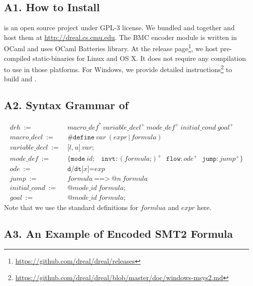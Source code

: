 \subsection*{A1. How to Install}
\dReach{} is an open source project under GPL-3 license. We bundled
\dReal{} and \dReach{} together and host them at
\url{http://dreal.cs.cmu.edu}. The BMC encoder module is written in
OCaml and uses OCaml Batteries library. At the release
page\footnote{\url{https://github.com/dreal/dreal/releases}}, we host
pre-compiled static-binaries for Linux and OS X. It does not require
any compilation to use \dReach{} in those platforms. For Windows, we
provide detailed
instructions\footnote{\url{https://github.com/dreal/dreal/blob/master/doc/windows-msys2.md}}
to build \dReach{} and \dReal{}.

\subsection*{A2. Syntax Grammar of \drh{}}
\begin{align*}
  \mathit{drh} \ := \ & \mathit{macro\_def}^* \
  \mathit{variable\_decl}^+ \ \mathit{mode\_def}^+ \  \mathit{initial\_cond} \  \mathit{goal}^+\\
  \mathit{macro\_decl} \ := \ &  \texttt{\#define} \ \mathit{var} \ (\mathit{expr} \, | \, \mathit{formula})\\
  \mathit{variable\_decl} \ := \ &  \texttt{[} \mathit{l} \texttt{,} \ \mathit{u} \texttt{]} \ \mathit{var} \texttt{;}\\
  \mathit{mode\_def} \ := \ & \texttt{\{}
  \texttt{mode} \
  \mathit{id}\texttt{;} \quad
  \texttt{invt}:(\mathit{formula} \texttt{;})^+ \ \ \
  \texttt{flow}:\mathit{ode}^+ \ \ \ \texttt{jump}:\mathit{jump}^+ \texttt{\}}\\
  \mathit{ode} \ := \ & \texttt{d/dt[}\mathit{x}\texttt{]=}\mathit{exp}\\
  \mathit{jump} \ := \ & \mathit{formula} \ \texttt{==>} \ \texttt{@}\mathit{n} \ \mathit{formula}\\
  \mathit{initial\_cond} \ := \ & \texttt{@}\mathit{mode\_id} \ \mathit{formula}\texttt{;}\\
  \mathit{goal}              \ := \ & \texttt{@}\mathit{mode\_id} \ \mathit{formula}\texttt{;}
\end{align*}
Note that we use the standard definitions for $\mathit{formlua}$ and
$\mathit{expr}$ here.

\subsection*{A3. An Example of Encoded SMT2 Formula}

